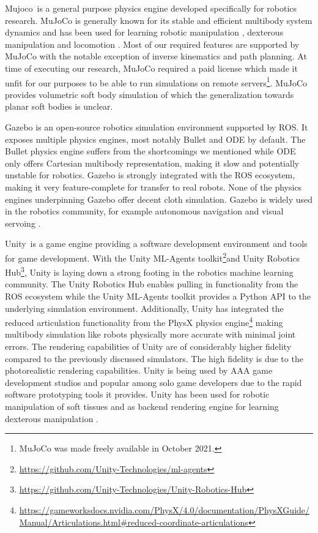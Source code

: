 \documentclass[\home/main.tex]{subfiles}
\begin{document}
Mujoco\textregistered~is a general purpose physics engine developed specifically for robotics research. MuJoCo is generally known for its stable and efficient multibody system dynamics \autocite{Erez2015} and has been used for learning robotic manipulation \autocite{rajeswaran2017learning}, dexterous manipulation \autocite{openai2019solving} and locomotion \autocite{heess2017emergence}. Most of our required features are supported by MuJoCo with the notable exception of inverse kinematics and path planning. At time of executing our research, MuJoCo required a paid license which made it unfit for our purposes to be able to run simulations on remote servers\footnote{MuJoCo was made freely available in October 2021.}. MuJoCo provides volumetric soft body simulation of which the generalization towards planar soft bodies is unclear.

Gazebo is an open-source robotics simulation environment supported by ROS. It exposes multiple physics engines, most notably Bullet and ODE by default. The Bullet physics engine suffers from the shortcomings we mentioned while ODE only offers Cartesian multibody representation, making it slow and potentially unstable for robotics. Gazebo is strongly integrated with the ROS ecosystem, making it very feature-complete for transfer to real robots. None of the physics engines underpinning Gazebo offer decent cloth simulation. Gazebo is widely used in the robotics community, for example autonomous navigation \autocite{Imanberdiyev2016} and visual servoing \autocite{Shi2018}.

Unity\textregistered~is a game engine providing a software development environment and tools for game development. With the Unity ML-Agents toolkit\footnote{\url{https://github.com/Unity-Technologies/ml-agents}}and Unity Robotics Hub\footnote{\url{https://github.com/Unity-Technologies/Unity-Robotics-Hub}}, Unity is laying down a strong footing in the robotics machine learning community. The Unity Robotics Hub enables pulling in functionality from the ROS ecosystem while the Unity ML-Agents toolkit provides a Python API to the underlying simulation environment. Additionally, Unity has integrated the reduced articulation functionality from the PhysX physics engine\footnote{\url{https://gameworksdocs.nvidia.com/PhysX/4.0/documentation/PhysXGuide/Manual/Articulations.html\#reduced-coordinate-articulations}} making multibody simulation like robots physically more accurate with minimal joint errors. The rendering capabilities of Unity are of considerably higher fidelity compared to the previously discussed simulators. The high fidelity is due to the photorealistic rendering capabilities. Unity is being used by AAA game development studios and popular among solo game developers due to the rapid software prototyping tools it provides. Unity has been used for robotic manipulation of soft tissues \autocite{Tagliabue2020} and as backend rendering engine for learning dexterous manipulation \autocite{openai2019solving}.
\end{document}
